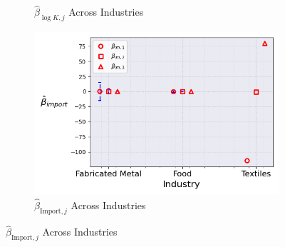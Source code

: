 \documentclass{article}
\begin{document}
\begin{figure}[ht!]
\begin{subfigure}[t]{0.32\textwidth}
        \caption{$\hat{\beta}_{\log K, j}$ Across Industries}
    \end{subfigure}
    \begin{subfigure}[t]{0.32\textwidth}
        \centering
        \includegraphics[width=\textwidth]{figure/ar1_normal_kmshare_ciiu_beta_im_across_industries_m3.png}
        \caption{$\hat{\beta}_{\text{Import},j}$ Across Industries}
    \end{subfigure}
\end{figure}
\end{document}
